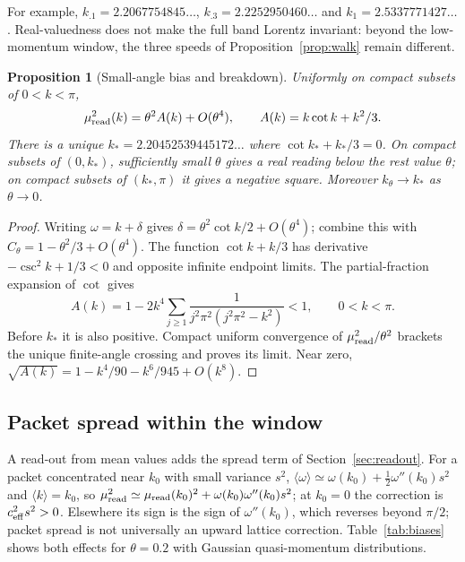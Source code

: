 \documentclass[12pt,a4paper]{article}
\newtheorem{proposition}[theorem]{Proposition}
\theoremstyle{definition}
\theoremstyle{remark}
\begin{document}
For example, $k_{.1}=2.2067754845\ldots$, $k_{.3}=2.2252950460\ldots$ and $k_1=2.5337771427\ldots$. Real-valuedness does not make the full band Lorentz invariant: beyond the low-momentum window, the three speeds of Proposition~\ref{prop:walk} remain different.

\begin{proposition}[Small-angle bias and breakdown]\label{prop:sharp}
Uniformly on compact subsets of $0<k<\pi$,
\[
 \mu_{\rm read}^2(k)=\theta^2 A(k)+O(\theta^4),\qquad
 A(k)=k\cot k+k^2/3 .
\]
There is a unique $k_*=2.20452539445172\ldots$ where $\cot k_*+k_*/3=0$. On compact subsets of $(0,k_*)$, sufficiently small $\theta$ gives a real reading below the rest value $\theta$; on compact subsets of $(k_*,\pi)$ it gives a negative square. Moreover $k_\theta\to k_*$ as $\theta\to0$.
\end{proposition}
\begin{proof}
Writing $\omega=k+\delta$ gives $\delta=\theta^2\cot k/2+O(\theta^4)$; combine this with $C_\theta=1-\theta^2/3+O(\theta^4)$. The function $\cot k+k/3$ has derivative $-\csc^2k+1/3<0$ and opposite infinite endpoint limits. The partial-fraction expansion of $\cot$ gives
\[
 A(k)=1-2k^4\sum_{j\ge1}
 \frac{1}{j^2\pi^2(j^2\pi^2-k^2)}<1,\qquad 0<k<\pi .
\]
Before $k_*$ it is also positive. Compact uniform convergence of $\mu_{\rm read}^2/\theta^2$ brackets the unique finite-angle crossing and proves its limit. Near zero,
$\sqrt{A(k)}=1-k^4/90-k^6/945+O(k^8)$.
\end{proof}

\subsection{Packet spread within the window}

A read-out from mean values adds the spread term of Section~\ref{sec:readout}. For a packet concentrated near $k_0$ with small variance $s^2$, $\langle\omega\rangle\simeq\omega(k_0)+\tfrac12\omega''(k_0)s^2$ and $\langle k\rangle=k_0$, so $\mu_{\rm read}^2\simeq\mu_{\rm read}(k_0)^2+\omega(k_0)\omega''(k_0)s^2$; at $k_0=0$ the correction is $c_{\rm eff}^2s^2>0$. Elsewhere its sign is the sign of $\omega''(k_0)$, which reverses beyond $\pi/2$; packet spread is not universally an upward lattice correction. Table~\ref{tab:biases} shows both effects for $\theta=0.2$ with Gaussian quasi-momentum distributions.
\end{document}
